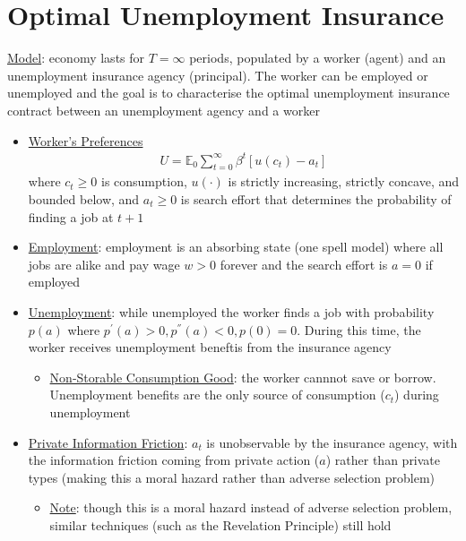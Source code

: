 \documentclass{article}
\begin{document}
\section{Optimal Unemployment Insurance}
\vspace{2.5mm}
\par \underline{Model}: economy lasts for $T = \infty$ periods, populated by a worker (agent) and an unemployment insurance agency (principal). The worker can be employed or unemployed and the goal is to characterise the optimal unemployment insurance contract between an unemployment agency and a worker
\begin{itemize}
    \item  \underline{Worker's Preferences}
    \begin{gather*}
        U = \mathbb{E}_{0} \sum_{t=0}^{\infty} \beta^{t} [u(c_{t}) - a_{t}]
    \end{gather*}
    where $c_{t} \geq 0$ is consumption, $u(\cdot)$ is strictly increasing, strictly concave, and bounded below, and $a_{t} \geq 0$ is search effort that determines the probability of finding a job at $t+1$
    \item  \underline{Employment}: employment is an absorbing state (one spell model) where all jobs are alike and pay wage $w > 0$ forever and the search effort is $a = 0$ if employed
    \item  \underline{Unemployment}: while unemployed the worker finds a job with probability $p(a)$ where $p^{'}(a) > 0, p^{''}(a) < 0, p(0) = 0$. During this time, the worker receives unemployment beneftis from the insurance agency
    \begin{itemize}
        \item  \underline{Non-Storable Consumption Good}: the worker cannnot save or borrow. Unemployment benefits are the only source of consumption ($c_{t}$) during unemployment
    \end{itemize}
    \item  \underline{Private Information Friction}: $a_{t}$ is unobservable by the insurance agency, with the information friction coming from private action ($a$) rather than private types (making this a moral hazard rather than adverse selection problem)
    \begin{itemize}
        \item  \underline{Note}: though this is a moral hazard instead of adverse selection problem, similar techniques (such as the Revelation Principle) still hold
    \end{itemize}

\end{itemize}
\end{document}
